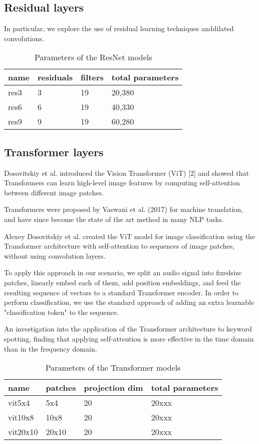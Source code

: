 \subsection{Residual layers}
In particular, we explore the use of residual learning techniques anddilated convolutions.


\begin{table}
	\centering
	\begin{tabular}{|l|l|l|l|}
    \hline
    name & residuals  & filters & total parameters \\
    \hline
    res3 & 3 & 19 & 20,380 \\
    \hline
    res6 & 6 & 19 & 40,330 \\
    \hline
    res9 & 9 & 19 & 60,280 \\
    \hline
    \end{tabular} 
\label{table:results}
\caption{Parameters of the ResNet models}
\end{table}

\subsection{Transformer layers}

Dosovitskiy et al. introduced the Vision Transformer (ViT) [2] and showed that Transformers can learn high-level image features by computing self-attention between different image patches. 	

Transformers were proposed by Vaswani et al. (2017) for machine translation, and have since become the state of the art method in many NLP tasks.
	 	 	 		
Alexey Dosovitskiy et al. created the ViT model for image classification using the Transformer architecture with self-attention to sequences of image patches, without using convolution layers.
	
 To apply this approach in our scenario, we split an audio signal into fixed\-size patches, linearly embed each of them, add position embeddings, and feed the resulting sequence of vectors to a standard Transformer encoder. In order to perform classification, we use the standard approach of adding an extra learnable "classification token" to the sequence.


An investigation into the application of the Transformer architecture to keyword spotting, finding that applying self-attention is more effective in the time domain than in the frequency domain.

\begin{table}
	\centering
	\begin{tabular}{|l|l|l|l|}
    \hline
    name & patches  & projection dim &  total parameters \\
    \hline
    vit5x4 & 5x4 & 20 & 20xxx \\
    \hline
    vit10x8 & 10x8 & 20 & 20xxx \\
    \hline
    vit20x10 & 20x10 & 20 & 20xxx \\
    \hline
    \end{tabular} 
\label{table:results}
\caption{Parameters of the Transformer models}
\end{table}


